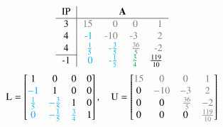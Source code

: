 \documentclass[10pt,a4paper]{article}
\begin{document}
	\begin{align*}
		\begin{tabular}{c|rrrr}
			IP &                                                     \multicolumn{4}{c}{\textbf{A}}                                                      \\ \hline
			3  &                   \textcolor{gray}{15} &                 \textcolor{gray}{0} &                \textcolor{gray}{0} & \textcolor{gray}{1} \\
			4  &            \textcolor{ProcessBlue}{-1} &               \textcolor{gray}{-10} &               \textcolor{gray}{-3} & \textcolor{gray}{2} \\
			4  & \textcolor{ProcessBlue}{$\frac{1}{5}$} & \textcolor{ProcessBlue}{-$\frac{3}{5}$} & \textcolor{gray}{$\frac{36}{5}$}\hspace{-0.1cm} & \textcolor{gray}{-2} \\ \cline{1-1}
			-1  &             \textcolor{ProcessBlue}{0} &   \textcolor{ProcessBlue}{-$\frac{1}{5}$} &                     $\textcolor{Green}{\frac{3}{4}}$ &      $\frac{119}{10}$
		\end{tabular}
	\end{align*}
	\begin{align*}
		\text{L}=
		\begin{bmatrix}
			1                                    & 0                                     & 0                                    & 0 \\
			\textcolor{ProcessBlue}{-1}          & 1                                     & 0                                    & 0 \\
			\textcolor{ProcessBlue}{\frac{1}{5}} & \textcolor{ProcessBlue}{-\frac{3}{5}} & 1                                    & 0 \\
			\textcolor{ProcessBlue}{0}           & \textcolor{ProcessBlue}{-\frac{1}{5}} & \textcolor{ProcessBlue}{\frac{3}{4}} & 1
		\end{bmatrix}
			,\quad
		\text{U}=
		\begin{bmatrix}
			\textcolor{gray}{15} & \textcolor{gray}{0}   & \textcolor{gray}{0}                           & \textcolor{gray}{1}  \\
			0                    & \textcolor{gray}{-10} & \textcolor{gray}{-3}                          & \textcolor{gray}{2}  \\
			0                    & 0                     & \textcolor{gray}{\frac{36}{5}}\hspace{-0.1cm} & \textcolor{gray}{-2} \\
			0                    & 0                     & 0                                             & \textcolor{gray}{\frac{119}{10}}
		\end{bmatrix}
	\end{align*}
\end{document}
